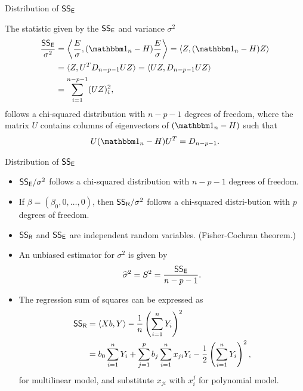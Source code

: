 \begin{frame}{Distribution of $\mathsf{SS_E}$}

\justifying
{} The statistic given by the $\mathsf{SS_E}$ and variance $\sigma^2$
\begin{align*}
\frac{\U{SS_E}}{\sigma^2} & = \left\langle \frac{E}{\sigma}, (\bbone_n - H)\frac{E}{\sigma}\right\rangle = \langle Z, (\bbone_n - H)Z\rangle \\
& = \langle Z, U^TD_{n-p-1}UZ\rangle = \langle UZ, D_{n-p-1}UZ\rangle \\
& = \sum_{i=1}^{n-p-1} (UZ)_i^2,
\end{align*}
follows a chi-squared distribution with $n-p-1$ degrees of freedom, where the matrix $U$ contains columns of eigenvectors of $(\bbone_n-H)$ such that
\begin{align*}
U(\bbone_n-H)U^T = D_{n-p-1}.
\end{align*}

\end{frame}

\begin{frame}{Distribution of $\mathsf{SS_E}$}

\begin{itemize}
	\justifying
	\item $\mathsf{SS_E}/\sigma^2$ follows a chi-squared distribution with $n-p-1$ degrees of freedom.
	\item If $\beta = (\beta_0, 0, \ldots, 0)$, then $\mathsf{SS_R}/\sigma^2$ follows a chi-squared distri-bution with $p$ degrees of freedom.
	\item $\mathsf{SS_R}$ and $\mathsf{SS_E}$ are independent random variables. (Fisher-Cochran theorem.)
	\item An unbiased estimator for $\sigma^2$ is given by
	\footnotesize
	\begin{align*}
	\widehat{\sigma}^2 = S^2 = \frac{\mathsf{SS_E}}{n-p-1}.
	\end{align*}
	\normalsize
	\item The regression sum of squares can be expressed as
	\footnotesize
	\begin{align*}
	\mathsf{SS_R} & = \langle Xb, Y\rangle - \frac{1}{n}\left(\sum_{i=1}^n Y_i \right)^2 \\
	& = b_0\sum_{i=1}^n Y_i + \sum_{j=1}^p b_j \sum_{i=1}^{n} x_{ji}Y_i - \frac{1}{2}\left(\sum_{i=1}^n Y_i \right)^2,
	\end{align*}
	\normalsize
	for multilinear model, and substitute $x_{ji}$ with $x_{i}^j$ for polynomial model.
\end{itemize}

\end{frame}

